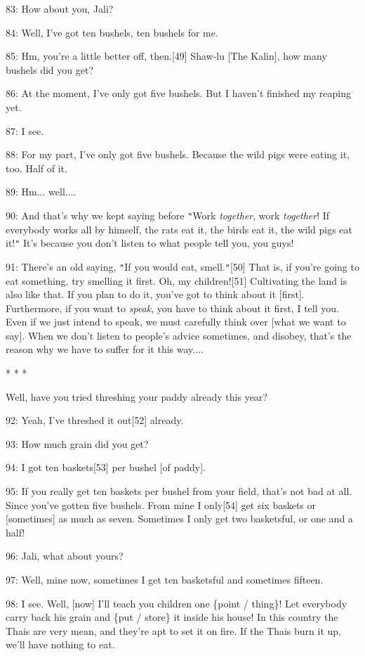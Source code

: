 83: How about you, Jali?

84: Well, I've got ten bushels, ten bushels for me.

85: Hm, you're a little better off, then.[49] Shaw-lu [The Kalin], how many bushels
did you get?

86: At the moment, I've only got five bushels. But I haven't finished my reaping
yet.

87: I see.

88: For my part, I've only got five bushels. Because the wild pigs were eating
it, too. Half of it.

89: Hm... well....

90: And that's why we kept saying before \texttt{"}Work\textit{ together}, work
\textit{together}! If everybody works all by himself, the rats eat it, the birds
eat it, the wild pigs eat it!\texttt{"} It's because you don't listen to what people
tell you, you guys!

91: There's an old saying, \texttt{"}If you would eat, smell.\texttt{"}[50] That
is, if you're going to eat something, try smelling it first. Oh, my children![51]
Cultivating the land is also like that. If you plan to do it, you've got to think
about it [first]. Furthermore, if you want to \textit{speak}, you have to think
about it first, I tell you. Even if we just intend to speak, we must carefully
think over [what we want to say]. When we don't listen to people's advice sometimes,
and disobey, that's the reason why we have to suffer for it this way....

\begin{center}
* * *
\end{center}

\leftskip=0pt
Well, have you tried threshing your paddy already this year?

92: Yeah, I've threshed it out[52] already.

93: How much grain did you get?

94: I got ten baskets[53] per bushel [of paddy].

95: If you really get ten baskets per bushel from your field, that's not bad at
all. Since you've gotten five bushels. From mine I only[54] get six baskets or
[sometimes] as much as seven. Sometimes I only get two basketsful, or one and a
half!

96: Jali, what about yours?

97: Well, mine now, sometimes I get ten basketsful and sometimes fifteen.

98: I see. Well, [now] I'll teach you children one \{point / thing\}! Let everybody
carry back his grain and \{put / store\} it inside his house! In this country the
Thais are very mean, and they're apt to set it on fire. If the Thais burn it up,
we'll have nothing to eat.

